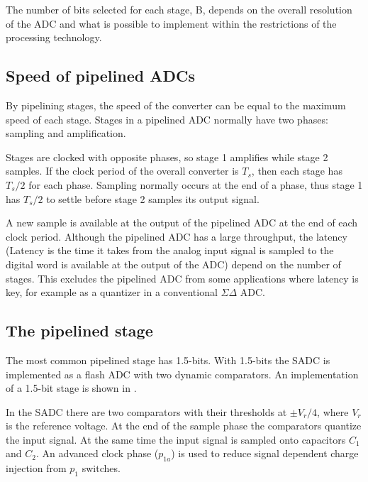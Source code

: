 The number of bits selected for each stage, B, depends on the
overall resolution of the ADC and what is possible to implement within
the restrictions of the processing technology.


\subsection{Speed of pipelined ADCs}
By pipelining stages, the speed of the converter can be equal to the
maximum speed of each stage. Stages in a pipelined ADC normally have
two phases: sampling and amplification. 

Stages are clocked
with opposite phases, so stage 1 amplifies while stage 2
samples. If the clock period of the overall converter is $T_s$, then each
stage has $T_s/2$ for each phase. Sampling normally occurs at the end
of a phase, thus stage 1 has $T_s/2$ to settle before stage 2 samples
 its output signal. 

A new sample is
available at the output of the pipelined ADC at the end of each clock
period. Although the pipelined ADC has a large throughput, the
latency (Latency is the time it takes from the analog input
  signal is sampled to the digital word is available at the output of
  the ADC) depend on the number of stages. This excludes the
pipelined ADC from some applications where latency is key, for example
as a quantizer in a conventional $\Sigma \Delta$ ADC.  


\subsection{The pipelined stage}
The most common pipelined stage has 1.5-bits. With 1.5-bits
the SADC is implemented as a flash ADC with two dynamic comparators. An
implementation of a 1.5-bit stage is shown in . 

In the SADC there are two comparators with their thresholds at
$\pm V_r/4$, where $V_r$ is the reference voltage. At the end of the sample phase
the
comparators quantize the input signal. At the same time the input
signal is sampled onto capacitors $C_1$ and $C_2$. An advanced clock
phase ($p_{1a}$) is used to reduce signal dependent charge injection from
$p_1$ switches.

